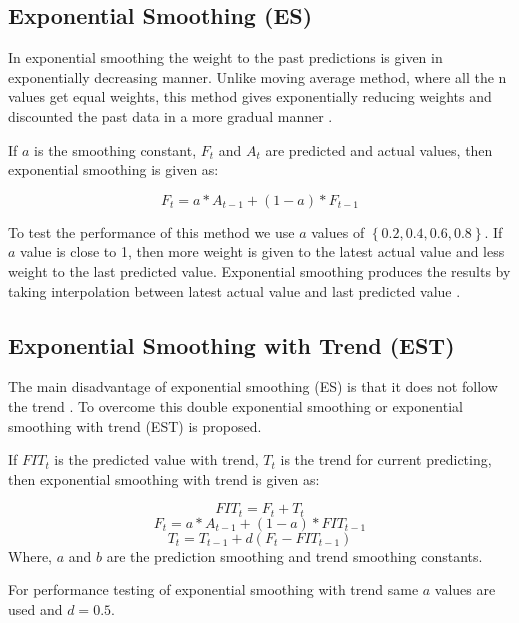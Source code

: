 \documentclass[conference,onecolumn]{IEEEtran}
\begin{document}
\subsection{Exponential Smoothing (ES)}
\label{subsec:ES}
In exponential smoothing the weight to the past predictions is given in exponentially decreasing manner. Unlike moving average method, where all the n values get equal weights, this method gives exponentially reducing weights and discounted the past data in a more gradual manner \cite{ES}.

If $a$ is the smoothing constant, $F_t$ and $A_t$ are predicted and actual values, then exponential smoothing is given as:

\begin{equation}
F_t = a * A_{t-1} + (1 - a) * F_{t-1}
\end{equation}

To test the performance of this method we use $a$ values of $\left \{ 0.2,0.4,0.6,0.8\right \}$. If $a$ value is close to 1, then more weight is given to the latest actual value and less weight to the last predicted value. Exponential smoothing produces the results by taking interpolation between latest actual value and last predicted value \cite{ES}.

\subsection{Exponential Smoothing with Trend (EST)}
\label{subsec:EST}
The main disadvantage of exponential smoothing (ES) is that it does not follow the trend \cite{ES2}. To overcome this double exponential smoothing or exponential smoothing with trend (EST) is proposed.

If $FIT_t$ is the predicted value with trend, $T_t$ is the trend for current predicting, then exponential smoothing with trend is given as:

\begin{equation}
FIT_t = F_t + T_t
\end{equation}
\begin{equation}
F_t = a * A_{t-1} + (1 - a) * FIT_{t-1}
\end{equation}
\begin{equation}
T_t = T_{t-1} + d (F_t - FIT_{t-1})
\end{equation}
Where, $a$ and $b$ are the prediction smoothing and trend smoothing constants.

For performance testing of exponential smoothing with trend same $a$ values are used and $d = 0.5$.
\end{document}

